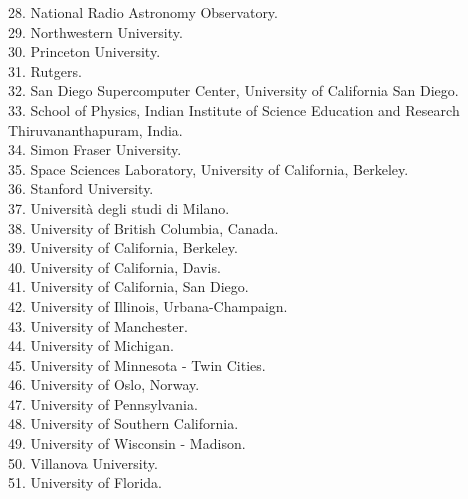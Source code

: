 \documentclass[PICOReport.tex]{subfiles}
\begin{document}
\begin{multicols}{2}
{28. National Radio Astronomy Observatory.  \\
29. Northwestern University.  \\
30. Princeton University.  \\
31. Rutgers.  \\
32. San Diego Supercomputer Center, University of California San Diego.  \\
33. School of Physics, Indian Institute of Science Education and Research Thiruvananthapuram,  India.  \\
34. Simon Fraser University.  \\
35. Space Sciences Laboratory, University of California, Berkeley.  \\
36. Stanford University.  \\
37. Universit\`a degli studi di Milano.  \\
38. University of British Columbia, Canada.  \\
39. University of California, Berkeley.  \\
40. University of California, Davis.  \\
41. University of California, San Diego.  \\
42. University of Illinois, Urbana-Champaign.  \\
43. University of Manchester.  \\
44. University of Michigan.  \\
45. University of Minnesota - Twin Cities.  \\
46. University of Oslo, Norway.  \\
47. University of Pennsylvania.  \\
48. University of Southern California.  \\
49. University of Wisconsin - Madison.  \\
50. Villanova University.     \\
51. University of Florida. 
}
\end{multicols}
\end{document}
